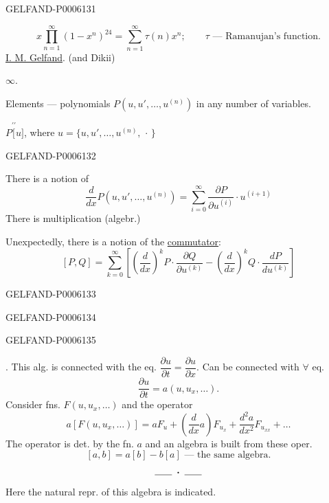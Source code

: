 \begin{GelfandAdjacentEvidence}{GELFAND-P000613}{1}
\qquad{}

\[
x\prod_{n=1}^\infty(1-x^n)^{24}=\sum_{n=1}^\infty\tau(n)x^n;
\qquad \tau\text{ — Ramanujan’s function}.
\]
\underline{I. M. Gelfand}. (and Dikii)

\(\infty\).

Elements — polynomials \(P(u,u',\ldots,u^{(n)})\) in any number of variables.

\(P\overset{\prime\prime}{[}u]\), where \(u=\{u,u',\ldots,u^{(n)},\,\cdot\,\}\)
\end{GelfandAdjacentEvidence}
\begin{GelfandAdjacentEvidence}{GELFAND-P000613}{2}


There is a notion of
\[
\frac{d}{dx}P(u,u',\ldots,u^{(n)})
=\sum_{i=0}^\infty\frac{\partial P}{\partial u^{(i)}}\cdot u^{(i+1)}
\]
There is multiplication (algebr.)

Unexpectedly, there is a notion of the \underline{commutator}:
\[
[P,Q]=\sum_{k=0}^\infty
\left[\left(\frac{d}{dx}\right)^kP\cdot\frac{\partial Q}{\partial u^{(k)}}
-\left(\frac{d}{dx}\right)^kQ\cdot\frac{dP}{du^{(k)}}\right]
\]
\end{GelfandAdjacentEvidence}
\begin{GelfandAdjacentEvidence}{GELFAND-P000613}{3}

\end{GelfandAdjacentEvidence}
\begin{GelfandAdjacentEvidence}{GELFAND-P000613}{4}

\end{GelfandAdjacentEvidence}
\begin{GelfandAdjacentEvidence}{GELFAND-P000613}{5}


. This alg. is connected with the eq. \(\dfrac{\partial u}{\partial t}=\dfrac{\partial u}{\partial x}\).
Can be connected with \(\forall\) eq.
\[
\frac{\partial u}{\partial t}=a(u,u_x,\ldots).
\]
Consider fns. \(F(u,u_x,\ldots)\) and the operator
\[
a[F(u,u_x,\ldots)]=aF_u+\left(\frac{d}{dx}a\right)F_{u_x}
+\frac{d^2a}{dx^2}F_{u_{xx}}+\ldots
\]
The operator is det. by the fn. \(a\) and an algebra is built from these oper.
\[
[a,b]=a[b]-b[a]\text{ — the same algebra}.
\]
\[\rule{1.8em}{.4pt}\;\boldsymbol{\cdot}\;\rule{1.8em}{.4pt}\]
Here the natural repr. of this algebra is indicated.
\end{GelfandAdjacentEvidence}
